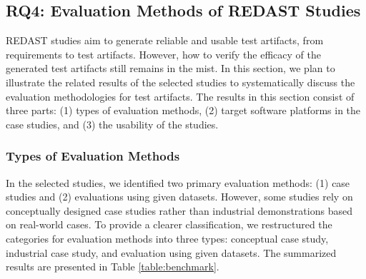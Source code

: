 \subsection{RQ4: Evaluation Methods of REDAST Studies}
REDAST studies aim to generate reliable and usable test artifacts, from requirements to test artifacts. However, how to verify the efficacy of the generated test artifacts still remains in the mist. In this section, we plan to illustrate the related results of the selected studies to systematically discuss the evaluation methodologies for test artifacts. The results in this section consist of three parts: (1) types of evaluation methods, (2) target software platforms in the case studies, and (3) the usability of the studies.

\subsubsection{Types of Evaluation Methods}

In the selected studies, we identified two primary evaluation methods: (1) case studies and (2) evaluations using given datasets. However, some studies rely on conceptually designed case studies rather than industrial demonstrations based on real-world cases. To provide a clearer classification, we restructured the categories for evaluation methods into three types: conceptual case study, industrial case study, and evaluation using given datasets. The summarized results are presented in Table \ref{table:benchmark}.
